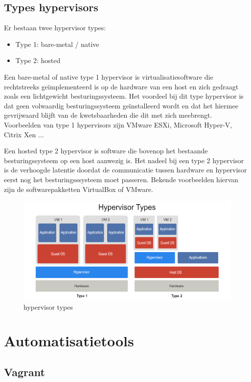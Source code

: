 \subsection{Types hypervisors}

Er bestaan twee hypervisor types:
\begin{itemize}
    \item Type 1: bare-metal / native
    \item Type 2: hosted
\end{itemize}

Een bare-metal of native type 1 hypervisor is virtualisatiesoftware die rechtstreeks geïmplementeerd is op de hardware van een host en zich gedraagt zoals een lichtgewicht besturingssysteem. Het voordeel bij dit type hypervisor is dat geen volwaardig besturingssysteem geïnstalleerd wordt en dat het hiermee gevrijwaard blijft van de kwetsbaarheden die dit met zich meebrengt. Voorbeelden van type 1 hypervisors zijn VMware ESXi, Microsoft Hyper-V, Citrix Xen ... 

Een hosted type 2 hypervisor is software die bovenop het bestaande besturingssysteem op een host aanwezig is. Het nadeel bij een type 2 hypervisor is de verhoogde latentie doordat de communicatie tussen hardware en hypervisor eerst nog het besturingsssysteem moet passeren. Bekende voorbeelden hiervan zijn de softwarepakketten VirtualBox of VMware. 

\begin{figure}[h]
    \centering
    \includegraphics[scale=.6]{img/Hypervisor-Types.png}
    \caption{hypervisor types \autocite{Vembu2019}}
    \label{hypervisors}
\end{figure}

\section{Automatisatietools}
\subsection{Vagrant}

